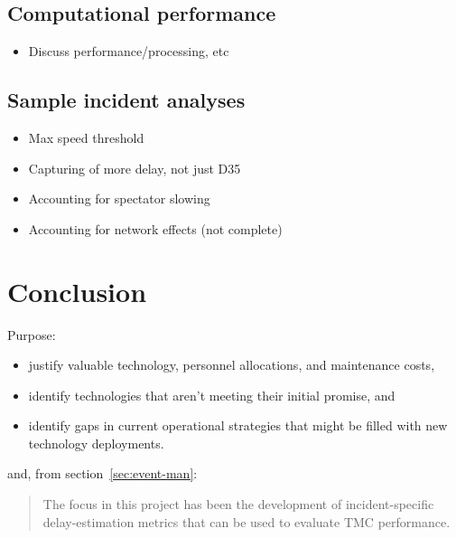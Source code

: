 \documentclass[12pt]{report}
\begin{document}
\section{Computational performance}
\label{sec:comp-perf}




\begin{itemize}
\item Discuss performance/processing, etc
\end{itemize}

\section{Sample incident analyses}
\label{sec:inc-anal}

\begin{itemize}
\item Max speed threshold
\item Capturing of more delay, not just D35
\item Accounting for spectator slowing
\item Accounting for network effects (not complete)
\end{itemize}



\chapter{Conclusion}
\label{chap:conclusion}


Purpose:
\begin{itemize}
\item justify valuable technology, personnel allocations, and
  maintenance costs,
\item identify technologies that aren't meeting their initial promise,
  and
\item identify gaps in current operational strategies that might be
  filled with new technology deployments.
\end{itemize}

and, from section~\ref{sec:event-man}:
\begin{quote}
  The focus in this project has been the development of incident-specific
  delay-estimation metrics that can be used to evaluate \ac{TMC} performance.
\end{quote}




\end{document}
